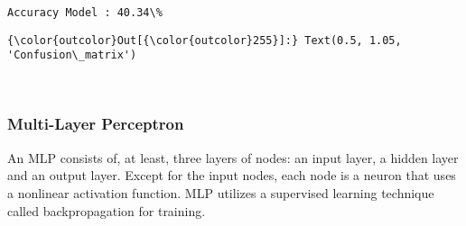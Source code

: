 \documentclass[11pt]{article}
\begin{document}
    \begin{Verbatim}[commandchars=\\\{\}]
Accuracy Model : 40.34\% 

    \end{Verbatim}

\begin{Verbatim}[commandchars=\\\{\}]
{\color{outcolor}Out[{\color{outcolor}255}]:} Text(0.5, 1.05, 'Confusion\_matrix')
\end{Verbatim}
            
    \begin{center}
    \end{center}
    { \hspace*{\fill} \\}
    
    \subsubsection{Multi-Layer Perceptron}\label{multi-layer-perceptron}

    An MLP consists of, at least, three layers of nodes: an input layer, a
hidden layer and an output layer. Except for the input nodes, each node
is a neuron that uses a nonlinear activation function. MLP utilizes a
supervised learning technique called backpropagation for training.
\end{document}
